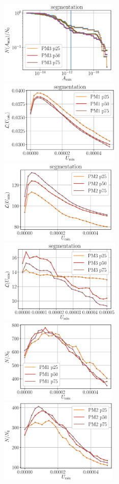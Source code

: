 \documentclass[draft,jgrga]{agutexSI2019}
\begin{document}
\begin{article}
\begin{figure}
\noindent\includegraphics[height=4cm]{figures/SI_figures/segm_N_vs_Amin_PM3.eps}\\
\noindent\includegraphics[height=4cm]{figures/SI_figures/L_vs_Umin_PM1.eps}
\noindent\includegraphics[height=4cm]{figures/SI_figures/L_vs_Umin_PM2.eps}
\noindent\includegraphics[height=4cm]{figures/SI_figures/L_vs_Umin_PM3.eps}\\
\noindent\includegraphics[height=4cm]{figures/SI_figures/N_vs_Umin_PM1.eps}
\noindent\includegraphics[height=4cm]{figures/SI_figures/N_vs_Umin_PM2.eps}

\end{figure}
\end{article}
\end{document}
